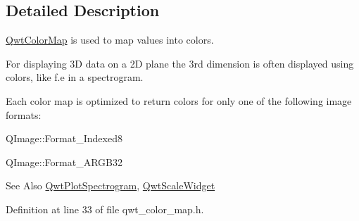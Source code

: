 \subsection{Detailed Description}
\hyperlink{class_qwt_color_map}{Qwt\-Color\-Map} is used to map values into colors. 

For displaying 3\-D data on a 2\-D plane the 3rd dimension is often displayed using colors, like f.\-e in a spectrogram.

Each color map is optimized to return colors for only one of the following image formats\-:


\begin{DoxyItemize}
\item Q\-Image\-::\-Format\-\_\-\-Indexed8\par

\item Q\-Image\-::\-Format\-\_\-\-A\-R\-G\-B32\par

\end{DoxyItemize}

\begin{DoxySeeAlso}{See Also}
\hyperlink{class_qwt_plot_spectrogram}{Qwt\-Plot\-Spectrogram}, \hyperlink{class_qwt_scale_widget}{Qwt\-Scale\-Widget} 
\end{DoxySeeAlso}


Definition at line 33 of file qwt\-\_\-color\-\_\-map.\-h.



